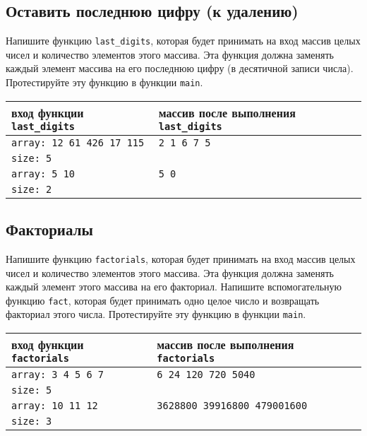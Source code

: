\documentclass{article}
\begin{document}
\subsection{Оставить последнюю цифру (к удалению)}
Напишите функцию \texttt{last\_digits}, которая будет принимать на вход массив целых чисел и количество элементов этого массива. Эта функция должна заменять каждый элемент массива на его последнюю цифру (в десятичной записи числа). Протестируйте эту функцию в функции \texttt{main}.

\begin{center}
\begin{tabular}{ l | l }
 вход функции \texttt{last\_digits} & массив после выполнения \texttt{last\_digits} \\ \hline
 \texttt{array: 12 61 426 17 115} & \texttt{2 1 6 7 5} \\
 \texttt{size: 5} & \\ \hline
 \texttt{array: 5 10} & \texttt{5 0} \\
 \texttt{size: 2} & \\
\end{tabular}
\end{center} 

\subsection{Факториалы}
Напишите функцию \texttt{factorials}, которая будет принимать на вход массив целых чисел и количество элементов этого массива. Эта функция должна заменять каждый элемент этого массива на его факториал. Напишите вспомогательную функцию \texttt{fact}, которая будет принимать одно целое число и возвращать факториал этого числа. Протестируйте эту функцию в функции \texttt{main}.
\begin{center}
\begin{tabular}{ l | l }
 вход функции \texttt{factorials} & массив после выполнения \texttt{factorials} \\ \hline
 \texttt{array: 3 4 5 6 7} & \texttt{6 24 120 720 5040} \\
 \texttt{size: 5} & \\ \hline
 \texttt{array: 10 11 12} & \texttt{3628800 39916800 479001600} \\
 \texttt{size: 3} & \\
\end{tabular}
\end{center} 
\end{document}
